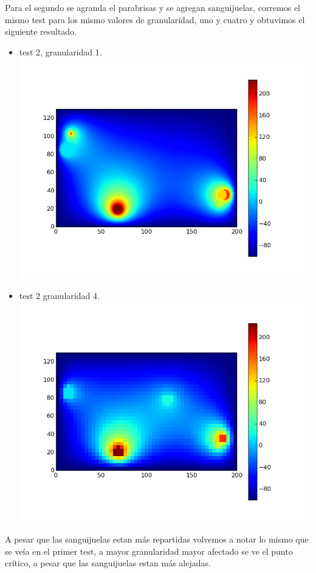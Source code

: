 Para el segundo se agranda el parabrisas y se agregan sanguijuelas, corremos el mismo test para los mismo valores de granularidad, uno y cuatro y obtuvimos el siguiente resultado.
\begin{itemize}
 \item test 2, granularidad 1.\\
  \includegraphics[width=400pt]{imagenes/testpropios/test21.png}

 \item test 2 granularidad 4.\\
  \includegraphics[width=400pt]{imagenes/testpropios/test24.png}
\end{itemize}
A pesar que las sanguijuelas estan más repartidas volvemos a notar lo mismo que se veía en el primer test, a mayor granularidad mayor afectado se ve el punto crítico, a pesar que las sanguijuelas estan más alejadas.

